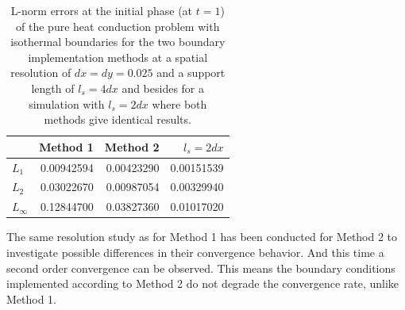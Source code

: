 \documentclass[11pt,a4paper,twoside]{report}
\begin{document}
 

\begin{table}[h] %
\label{tab:2DSPH_LinearWall_ThermalBC_Errors_supLen4dx}
\centering
\begin{tabular}[c]{||l||r|r|r||} %
\hline
\hline
 &{\bf Method 1} & {\bf Method 2} &{\bf $l_s=2dx$} \\
\hline
\hline
$L_1$&0.00942594 &  0.00423290&0.00151539  \\
\hline
$L_2$&0.03022670 & 0.00987054& 0.00329940 \\
\hline
$L_\infty$&0.12844700 & 0.03827360& 0.01017020 \\
\hline
\hline
\end{tabular}


\caption[]{L-norm errors at the initial phase (at $t=1$) of the pure heat conduction problem with isothermal boundaries for the two boundary implementation methods at a spatial resolution of $dx=dy=0.025$ and a support length of $l_s=4dx$ and besides for a simulation with $l_s=2dx$ where both methods give identical results.}
\end{table}


 The same resolution study as for Method 1 has been conducted for Method 2 to investigate possible differences in their convergence behavior. And this time a second order convergence can be observed. This means the boundary conditions  implemented according to Method 2 do not degrade the convergence rate, unlike Method 1.
\end{document}

